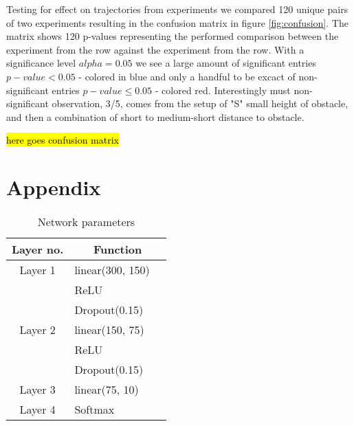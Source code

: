 \documentclass{article}
\begin{document}
Testing for effect on trajectories from experiments we compared 120 unique pairs of two experiments resulting in the confusion matrix in figure \ref{fig:confusion}. The matrix shows 120 p-values representing the performed comparison between the experiment from the row against the experiment from the row. With a significance level $alpha = 0.05$ we see a large amount of significant entries $p-value < 0.05$ - colored in blue and only a handful to be excact of non-significant entries $p-value \leq 0.05$ - colored red. Interestingly must non-significant observation, 3/5, comes from the setup of "S" small height of obstacle, and then a combination of short to medium-short distance to obstacle.

\hl{here goes confusion matrix}
\section{Appendix}
\begin{table}[H]
\centering
\begin{tabular}[H]{c l @{} l}
\centering
Layer no.       &
\multicolumn{2}{c}{Function} \\
\hline
Layer 1     & linear(300, 150) \\
            & ReLU \\
            & Dropout(0.15) \\
Layer 2     & linear(150, 75) \\ 
            & ReLU \\
            & Dropout(0.15) \\
Layer 3     & linear(75, 10) \\ 
Layer 4     & Softmax\\ 
\end{tabular}\\
\caption{Network parameters}
\label{tab:ann} 
\end{table}
\end{document}
